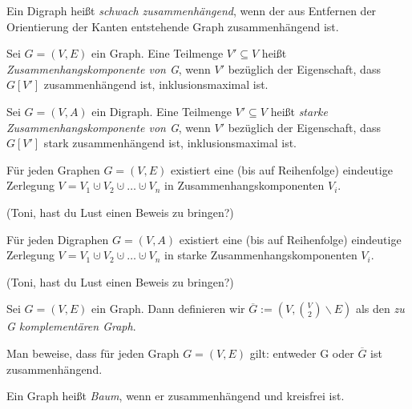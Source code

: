 \documentclass[10pt]{scrbook}
\begin{document}
\begin{Def}
Ein Digraph heißt \emph{schwach zusammenhängend}, wenn der aus Entfernen der Orientierung der Kanten entstehende Graph zusammenhängend ist.
\end{Def}

\begin{Def}
Sei $G=(V, E)$ ein Graph. Eine Teilmenge $V'\subseteq V$ heißt \emph{Zusammenhangskomponente von G}, wenn $V'$ bezüglich der Eigenschaft, dass $G[V']$ zusammenhängend ist, inklusionsmaximal ist.
\end{Def}

\begin{Def}
Sei $G=(V, A)$ ein Digraph. Eine Teilmenge $V'\subseteq V$ heißt \emph{starke Zusammenhangskomponente von G}, wenn $V'$ bezüglich der Eigenschaft, dass $G[V']$ stark zusammenhängend ist, inklusionsmaximal ist.
\end{Def}

\begin{Le}
Für jeden Graphen $G=(V, E)$ existiert eine (bis auf Reihenfolge) eindeutige Zerlegung $V=V_1\cupdot V_2 \cupdot \ldots \cupdot V_n$ in Zusammenhangskomponenten $V_i$.
\end{Le}
\begin{bew}
(Toni, hast du Lust einen Beweis zu bringen?)
\end{bew}

\begin{Le}
Für jeden Digraphen $G=(V, A)$ existiert eine (bis auf Reihenfolge) eindeutige Zerlegung $V=V_1\cupdot V_2 \cupdot \ldots \cupdot V_n$ in starke Zusammenhangskomponenten $V_i$.
\end{Le}
\begin{bew}
(Toni, hast du Lust einen Beweis zu bringen?)
\end{bew}

\begin{Def}
Sei $G=\left(V, E\right)$ ein Graph. Dann definieren wir $\overline{G}:=\left(V, {V \choose 2} \backslash E\right)$ als den \emph{zu G komplementären Graph}.
\end{Def}

\begin{Auf}
Man beweise, dass für jeden Graph $G=\left(V, E\right)$ gilt: entweder G oder $\overline{G}$ ist zusammenhängend.
\end{Auf}

\begin{Def}
Ein Graph heißt \emph{Baum}, wenn er zusammenhängend und kreisfrei ist.
\end{Def}
\end{document}
